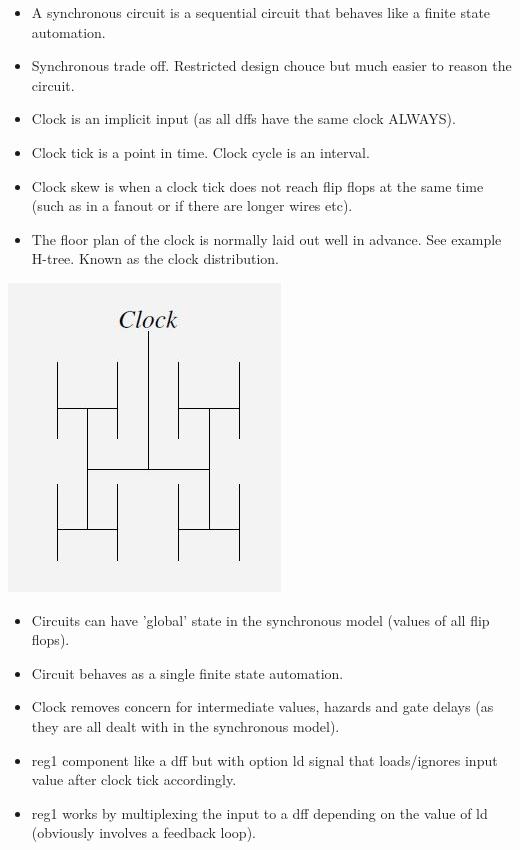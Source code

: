 \documentclass{article}
\begin{document}
\begin{itemize}
\item A synchronous circuit is a sequential circuit that behaves like a finite state automation.
\item Synchronous trade off. Restricted design chouce but much easier to reason the circuit.
\item Clock is an implicit input (as all dffs have the same clock ALWAYS).
\item Clock tick is a point in time. Clock cycle is an interval.
\item Clock skew is when a clock tick does not reach flip flops at the same time (such as in a fanout or if there are longer wires etc). 
\item The floor plan of the clock is normally laid out well in advance. See example H-tree. Known as the clock distribution.
\end{itemize}
\begin{center}
\includegraphics[width=0.5\linewidth]{hlayout}
\end{center}
\begin{itemize}
\item Circuits can have 'global' state in the synchronous model (values of all flip flops).
\item Circuit behaves as a single finite state automation.
\item Clock removes concern for intermediate values, hazards and gate delays (as they are all dealt with in the synchronous model).
\item reg1 component like a dff but with option ld signal that loads/ignores input value after clock tick accordingly.
\item reg1 works by multiplexing the input to a dff depending on the value of ld (obviously involves a feedback loop).
\end{itemize}
\end{document}
